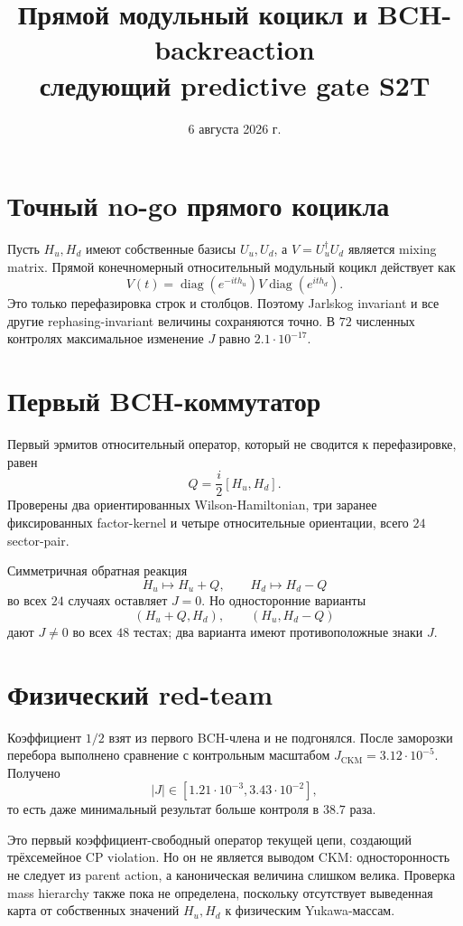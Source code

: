 \documentclass[12pt,a4paper]{article}
\title{Прямой модульный коцикл и BCH-backreaction\\
следующий predictive gate S2T}
\author{}
\date{6 августа 2026 г.}
\begin{document}
\maketitle

\section{Точный no-go прямого коцикла}

Пусть \(H_u,H_d\) имеют собственные базисы \(U_u,U_d\), а
\(V=U_u^\dagger U_d\) является mixing matrix. Прямой конечномерный
относительный модульный коцикл действует как
\[
 V(t)=\operatorname{diag}(e^{-it h_u})
 V\operatorname{diag}(e^{it h_d}).
\]
Это только перефазировка строк и столбцов. Поэтому Jarlskog invariant и все
другие rephasing-invariant величины сохраняются точно. В \(72\) численных
контролях максимальное изменение \(J\) равно
\(2.1\cdot10^{-17}\).

\section{Первый BCH-коммутатор}

Первый эрмитов относительный оператор, который не сводится к перефазировке,
равен
\[
 Q=\frac{i}{2}[H_u,H_d].
\]
Проверены два ориентированных Wilson-Hamiltonian, три заранее фиксированных
factor-kernel и четыре относительные ориентации, всего \(24\) sector-pair.

Симметричная обратная реакция
\[
 H_u\mapsto H_u+Q,
 \qquad
 H_d\mapsto H_d-Q
\]
во всех \(24\) случаях оставляет \(J=0\). Но односторонние варианты
\[
 (H_u+Q,H_d),
 \qquad
 (H_u,H_d-Q)
\]
дают \(J\ne0\) во всех \(48\) тестах; два варианта имеют противоположные
знаки \(J\).

\section{Физический red-team}

Коэффициент \(1/2\) взят из первого BCH-члена и не подгонялся. После
заморозки перебора выполнено сравнение с контрольным масштабом
\(J_{\mathrm{CKM}}=3.12\cdot10^{-5}\). Получено
\[
 |J|\in[1.21\cdot10^{-3},3.43\cdot10^{-2}],
\]
то есть даже минимальный результат больше контроля в \(38.7\) раза.

Это первый коэффициент-свободный оператор текущей цепи, создающий
трёхсемейное CP violation. Но он не является выводом CKM: односторонность не
следует из parent action, а каноническая величина слишком велика. Проверка
mass hierarchy также пока не определена, поскольку отсутствует выведенная
карта от собственных значений \(H_u,H_d\) к физическим Yukawa-массам.
\end{document}
